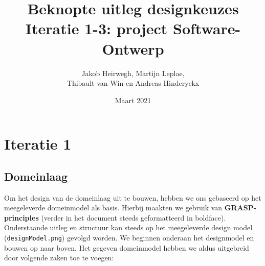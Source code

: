 \documentclass[12pt]{article}
\title{Beknopte uitleg designkeuzes\\ Iteratie 1-3: project Software-Ontwerp}
\author{Jakob Heirwegh, Martijn Leplae,\\ Thibault van Win en Andreas Hinderyckx}
\date{Maart 2021}
\begin{document}
\maketitle

\newpage
\section{Iteratie 1}\label{sec:Iteratie1}
\subsection{Domeinlaag}
Om het design van de domeinlaag uit te bouwen, hebben we ons gebaseerd op het meegeleverde domeinmodel als basis. Hierbij maakten we gebruik van \textbf{GRASP-principles} (verder in het document steeds geformatteerd in boldface). Onderstaande uitleg en structuur kan steeds op het meegeleverde design model (\texttt{designModel.png}) gevolgd worden. We beginnen onderaan het designmodel en bouwen op naar boven. Het gegeven domeinmodel hebben we aldus uitgebreid door volgende zaken toe te voegen:
\end{document}
